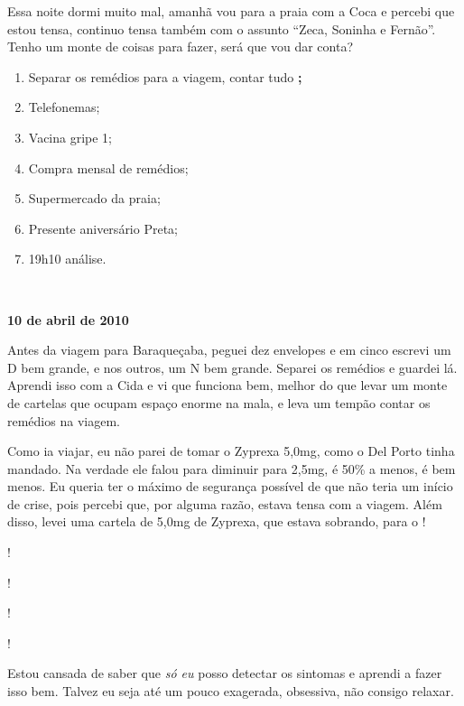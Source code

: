 Essa noite dormi muito mal, amanhã vou para a praia com a Coca e percebi
que estou tensa, continuo tensa também com o assunto ``Zeca, Soninha e
Fernão''. Tenho um monte de coisas para fazer, será que vou dar conta?

\begin{enumerate}
\item
  Separar os remédios para a viagem, contar tudo  
  \textbf{;}
\item
  Telefonemas;
\item
  Vacina gripe 1;
\item
  Compra mensal de remédios;
\item
  Supermercado da praia;
\item
  Presente aniversário Preta;
\item
  19h10 análise.
\end{enumerate}
\begin{center}​​\asterisc{}\end{center}
 \begin{flushright}\textbf{}\end{flushright}

\begin{flushright}\textbf{10 de abril de 2010}\end{flushright}


Antes da viagem para Baraqueçaba, peguei dez envelopes e em cinco
escrevi um D bem grande, e nos outros, um N bem grande. Separei os
remédios e guardei lá. Aprendi isso com a Cida e vi que funciona bem,
melhor do que levar um monte de cartelas que ocupam espaço enorme na
mala, e leva um tempão contar os remédios na viagem.

Como ia viajar, eu não parei de tomar o Zyprexa 5,0mg, como o Del Porto
tinha mandado. Na verdade ele falou para diminuir para 2,5mg, é 50\% a
menos, é bem menos. Eu queria ter o máximo de segurança possível de que
não teria um início de crise, pois percebi que, por alguma razão, estava
tensa com a viagem. Além disso, levei uma cartela de 5,0mg de Zyprexa,
que estava sobrando, para o     !

 !

 !

     !

!

Estou cansada de saber que \emph{só eu} posso detectar os sintomas e
aprendi a fazer isso bem. Talvez eu seja até um pouco exagerada,
obsessiva, não consigo relaxar.

